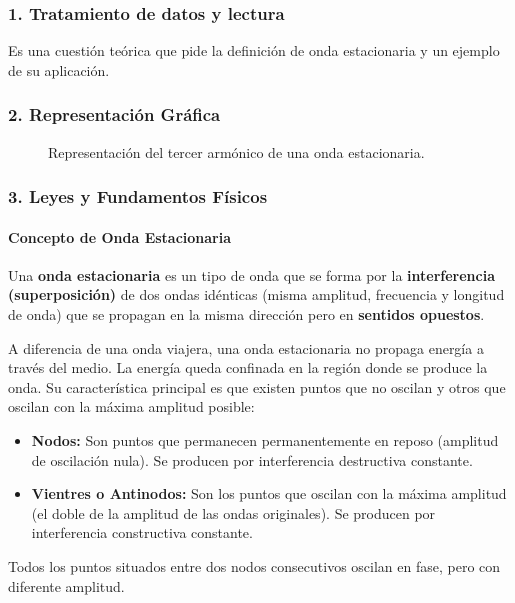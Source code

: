\subsubsection*{1. Tratamiento de datos y lectura}
Es una cuestión teórica que pide la definición de onda estacionaria y un ejemplo de su aplicación.

\subsubsection*{2. Representación Gráfica}
\begin{figure}[H]
    \centering
    \caption{Representación del tercer armónico de una onda estacionaria.}
\end{figure}

\subsubsection*{3. Leyes y Fundamentos Físicos}
\paragraph*{Concepto de Onda Estacionaria}
Una \textbf{onda estacionaria} es un tipo de onda que se forma por la \textbf{interferencia (superposición)} de dos ondas idénticas (misma amplitud, frecuencia y longitud de onda) que se propagan en la misma dirección pero en \textbf{sentidos opuestos}.

A diferencia de una onda viajera, una onda estacionaria no propaga energía a través del medio. La energía queda confinada en la región donde se produce la onda. Su característica principal es que existen puntos que no oscilan y otros que oscilan con la máxima amplitud posible:
\begin{itemize}
    \item \textbf{Nodos:} Son puntos que permanecen permanentemente en reposo (amplitud de oscilación nula). Se producen por interferencia destructiva constante.
    \item \textbf{Vientres o Antinodos:} Son los puntos que oscilan con la máxima amplitud (el doble de la amplitud de las ondas originales). Se producen por interferencia constructiva constante.
\end{itemize}
Todos los puntos situados entre dos nodos consecutivos oscilan en fase, pero con diferente amplitud.

